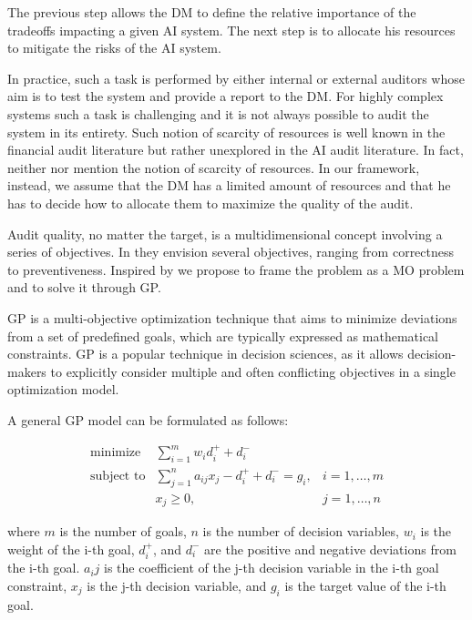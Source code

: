 The previous step allows the DM to define the relative importance of the tradeoffs impacting a given AI system.
The next step is to allocate his resources to mitigate the risks of the AI system.

In practice, such a task is performed by either internal or external auditors whose aim is to test the system and provide a report to the DM.
For highly complex systems such a task is challenging and it is not always possible to audit the system in its entirety.
Such notion of scarcity of resources is well known in the financial audit literature but rather unexplored in the AI audit literature.
In fact, neither \cite{floridi_2022} nor \cite{zicari_2021} mention the notion of scarcity of resources.
In our framework, instead, we assume that the DM has a limited amount of resources and that he has to decide how to allocate them to maximize the quality of the audit.

Audit quality, no matter the target, is a multidimensional concept involving a series of objectives. 
In \cite{kinney_1972} they envision several objectives, ranging from correctness to preventiveness.
Inspired by \cite{tayi_1985} we propose to frame the problem as a MO problem and to solve it through GP.

GP is a multi-objective optimization technique that aims to minimize deviations from a set of predefined goals, which are typically expressed as mathematical constraints. 
GP is a popular technique in decision sciences, as it allows decision-makers to explicitly consider multiple and often conflicting objectives in a single optimization model.

A general GP model can be formulated as follows:

\begin{align}
\text{minimize} & \sum_{i=1}^m w_i d_i^+ + d_i^- \\
\text{subject to} & \sum_{j=1}^n a_{ij} x_j - d_i^+ + d_i^- = g_i, &i=1,\dots,m \\
& x_j \ge 0, &j=1,\dots,n
\end{align}

where $m$ is the number of goals, $n$ is the number of decision variables, $w_i$ is the weight of the i-th goal, $d_i^+$, and $d_i^-$ are the positive and negative deviations from the i-th goal. $a_ij$ is the coefficient of the j-th decision variable in the i-th goal constraint, $x_j$ is the j-th decision variable, and $g_i$ is the target value of the i-th goal.

